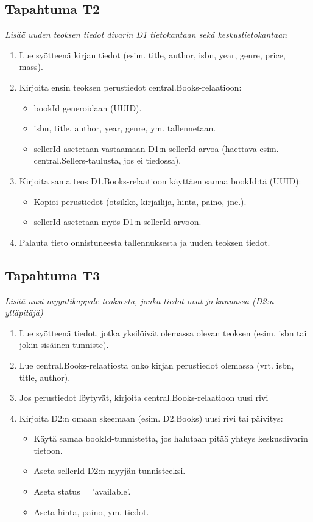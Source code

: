 \documentclass[11pt,a4paper]{article}
\begin{document}
\subsection{Tapahtuma T2}
{\large{\textit{Lisää uuden teoksen tiedot divarin D1 tietokantaan sekä keskustietokantaan}}}

\begin{enumerate}
	\item Lue syötteenä kirjan tiedot (esim. title, author, isbn, year, genre, price, mass).
	\item Kirjoita ensin teoksen perustiedot central.Books-relaatioon:
	      \begin{itemize}
		      \item bookId generoidaan (UUID).
		      \item isbn, title, author, year, genre, ym. tallennetaan.
		      \item sellerId asetetaan vastaamaan D1:n sellerId-arvoa (haettava esim. central.Sellers-taulusta, jos ei tiedossa).
	      \end{itemize}
	\item Kirjoita sama teos D1.Books-relaatioon käyttäen samaa bookId:tä (UUID):
	      \begin{itemize}
		      \item Kopioi perustiedot (otsikko, kirjailija, hinta, paino, jne.).
		      \item sellerId asetetaan myös D1:n sellerId-arvoon.
	      \end{itemize}
	\item Palauta tieto onnistuneesta tallennuksesta ja uuden teoksen tiedot.
\end{enumerate}

\subsection{Tapahtuma T3}
{\large{\textit{Lisää uusi myyntikappale teoksesta, jonka tiedot ovat jo kannassa (D2:n ylläpitäjä)}}}

\begin{enumerate}
	\item Lue syötteenä tiedot, jotka yksilöivät olemassa olevan teoksen (esim. isbn tai jokin sisäinen tunniste).
	\item Lue central.Books-relaatiosta onko kirjan perustiedot olemassa (vrt. isbn, title, author).
	\item Jos perustiedot löytyvät, kirjoita central.Books-relaatioon uusi rivi
	\item Kirjoita D2:n omaan skeemaan (esim. D2.Books) uusi rivi tai päivitys:
	      \begin{itemize}
		      \item Käytä samaa bookId-tunnistetta, jos halutaan pitää yhteys keskusdivarin tietoon.
		      \item Aseta sellerId D2:n myyjän tunnisteeksi.
		      \item Aseta status = 'available'.
		      \item Aseta hinta, paino, ym. tiedot.
	      \end{itemize}
\end{enumerate}
\end{document}
